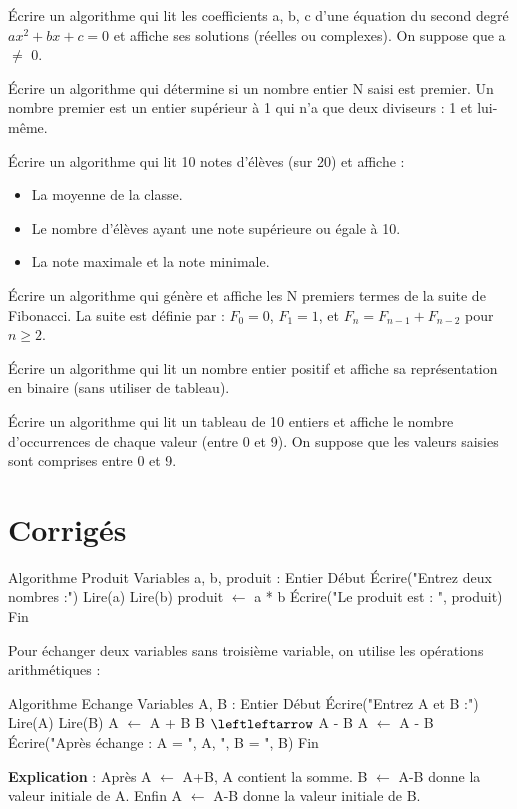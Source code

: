 
\sujetbac[2020, Cameroun, C/D/E]
\exo{}
Écrire un algorithme qui lit les coefficients a, b, c d'une équation du second degré $ax^2 + bx + c = 0$ et affiche ses solutions (réelles ou complexes). On suppose que a $\neq$ 0.

\sujetbac[2021, Cameroun, C/D/E]
\exo{}
Écrire un algorithme qui détermine si un nombre entier N saisi est premier. Un nombre premier est un entier supérieur à 1 qui n'a que deux diviseurs : 1 et lui-même.

\sujetbac[2022, Cameroun, C/D/E]
\exo{}
Écrire un algorithme qui lit 10 notes d'élèves (sur 20) et affiche :
\begin{itemize}
    \item La moyenne de la classe.
    \item Le nombre d'élèves ayant une note supérieure ou égale à 10.
    \item La note maximale et la note minimale.
\end{itemize}

\sujetbac[2023, Cameroun, C/D/E]
\exo{}
Écrire un algorithme qui génère et affiche les N premiers termes de la suite de Fibonacci. La suite est définie par : $F_0 = 0$, $F_1 = 1$, et $F_n = F_{n-1} + F_{n-2}$ pour $n \geq 2$.

\exo{}
Écrire un algorithme qui lit un nombre entier positif et affiche sa représentation en binaire (sans utiliser de tableau).

\exo{}
Écrire un algorithme qui lit un tableau de 10 entiers et affiche le nombre d'occurrences de chaque valeur (entre 0 et 9). On suppose que les valeurs saisies sont comprises entre 0 et 9.

\section{Corrigés}

\begin{algo}
Algorithme Produit
Variables
    a, b, produit : Entier
Début
    Écrire("Entrez deux nombres :")
    Lire(a)
    Lire(b)
    produit $\leftarrow$ a * b
    Écrire("Le produit est : ", produit)
Fin
\end{algo}

Pour échanger deux variables sans troisième variable, on utilise les opérations arithmétiques :
\begin{algo}
Algorithme Echange
Variables
    A, B : Entier
Début
    Écrire("Entrez A et B :")
    Lire(A)
    Lire(B)
    A $\leftarrow$ A + B
    B $\leftleftarrow$ A - B
    A $\leftarrow$ A - B
    Écrire("Après échange : A = ", A, ", B = ", B)
Fin
\end{algo}
\textbf{Explication} : Après A $\leftarrow$ A+B, A contient la somme. B $\leftarrow$ A-B donne la valeur initiale de A. Enfin A $\leftarrow$ A-B donne la valeur initiale de B.

